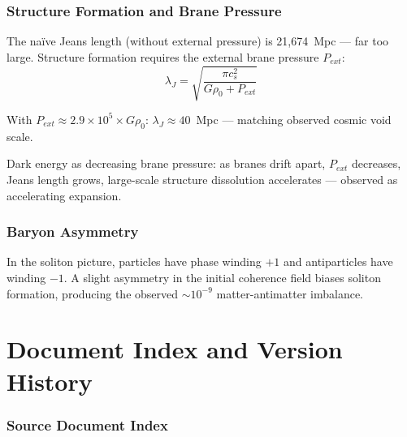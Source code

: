 \documentclass[11pt, a4paper]{article}
\begin{document}
\section{Structure Formation and Brane Pressure}

The na\"ive Jeans length (without external pressure) is
21,674~Mpc --- far too large. Structure formation requires the
external brane pressure $P_{ext}$:
\begin{equation}
  \lambda_J = \sqrt{\frac{\pi c_s^2}{G\rho_0 + P_{ext}}}
\end{equation}

With $P_{ext} \approx 2.9 \times 10^5 \times G\rho_0$:
$\lambda_J \approx 40$~Mpc --- matching observed cosmic void scale.

Dark energy as decreasing brane pressure: as branes drift apart,
$P_{ext}$ decreases, Jeans length grows, large-scale structure
dissolution accelerates --- observed as accelerating expansion.

\section{Baryon Asymmetry}

In the soliton picture, particles have phase winding $+1$ and
antiparticles have winding $-1$. A slight asymmetry in the initial
coherence field biases soliton formation, producing the observed
$\sim 10^{-9}$ matter-antimatter imbalance.

\newpage

\part{Document Index and Version History}

\section{Source Document Index}
\end{document}
